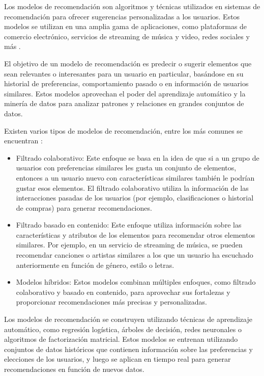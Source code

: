 Los modelos de recomendación son algoritmos y técnicas utilizados en sistemas de recomendación para ofrecer sugerencias personalizadas a los usuarios. Estos modelos se utilizan en una amplia gama de aplicaciones, como plataformas de comercio electrónico, servicios de streaming de música y video, redes sociales y más \cite{crear-recomendacion}.

El objetivo de un modelo de recomendación es predecir o sugerir elementos que sean relevantes o interesantes para un usuario en particular, basándose en su historial de preferencias, comportamiento pasado o en información de usuarios similares. Estos modelos aprovechan el poder del aprendizaje automático y la minería de datos para analizar patrones y relaciones en grandes conjuntos de datos.

Existen varios tipos de modelos de recomendación, entre los más comunes se encuentran \cite{recomendation-systems}:

\begin{itemize}
    \item Filtrado colaborativo: Este enfoque se basa en la idea de que si a un grupo de usuarios con preferencias similares les gusta un conjunto de elementos, entonces a un usuario nuevo con características similares también le podrían gustar esos elementos. El filtrado colaborativo utiliza la información de las interacciones pasadas de los usuarios (por ejemplo, clasificaciones o historial de compras) para generar recomendaciones.
    \item Filtrado basado en contenido: Este enfoque utiliza información sobre las características y atributos de los elementos para recomendar otros elementos similares. Por ejemplo, en un servicio de streaming de música, se pueden recomendar canciones o artistas similares a los que un usuario ha escuchado anteriormente en función de género, estilo o letras.
    \item Modelos híbridos: Estos modelos combinan múltiples enfoques, como filtrado colaborativo y basado en contenido, para aprovechar sus fortalezas y proporcionar recomendaciones más precisas y personalizadas.
\end{itemize}

Los modelos de recomendación se construyen utilizando técnicas de aprendizaje automático, como regresión logística, árboles de decisión, redes neuronales o algoritmos de factorización matricial. Estos modelos se entrenan utilizando conjuntos de datos históricos que contienen información sobre las preferencias y elecciones de los usuarios, y luego se aplican en tiempo real para generar recomendaciones en función de nuevos datos.

